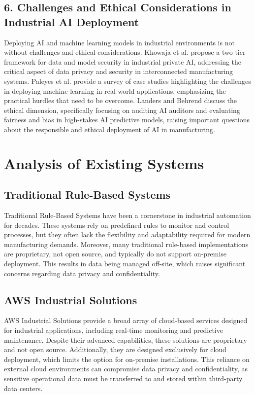 \subsection*{6. Challenges and Ethical Considerations in Industrial AI Deployment}

Deploying AI and machine learning models in industrial environments is not without challenges and ethical considerations. Khowaja et al. \cite{khowaja-2022} propose a two-tier framework for data and model security in industrial private AI, addressing the critical aspect of data privacy and security in interconnected manufacturing systems. Paleyes et al. \cite{paleyes-2022} provide a survey of case studies highlighting the challenges in deploying machine learning in real-world applications, emphasizing the practical hurdles that need to be overcome. Landers and Behrend \cite{landers-2022} discuss the ethical dimension, specifically focusing on auditing AI auditors and evaluating fairness and bias in high-stakes AI predictive models, raising important questions about the responsible and ethical deployment of AI in manufacturing.

\section{Analysis of Existing Systems}

\subsection{Traditional Rule-Based Systems}
Traditional Rule-Based Systems have been a cornerstone in industrial automation for decades. \cite{costa-2023} These systems rely on predefined rules to monitor and control processes, but they often lack the flexibility and adaptability required for modern manufacturing demands. Moreover, many traditional rule-based implementations are proprietary, not open source, and typically do not support on-premise deployment. This results in data being managed off-site, which raises significant concerns regarding data privacy and confidentiality.

\subsection{AWS Industrial Solutions}
AWS Industrial Solutions provide a broad array of cloud-based services designed for industrial applications, including real-time monitoring and predictive maintenance. \cite{aws-2025} Despite their advanced capabilities, these solutions are proprietary and not open source. Additionally, they are designed exclusively for cloud deployment, which limits the option for on-premise installations. This reliance on external cloud environments can compromise data privacy and confidentiality, as sensitive operational data must be transferred to and stored within third-party data centers.

